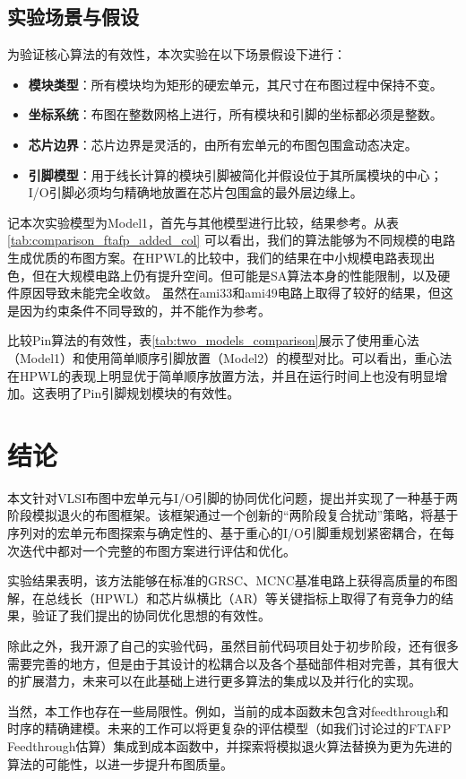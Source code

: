 \documentclass[conference]{IEEEtran}
\begin{document}
\subsection{实验场景与假设}
为验证核心算法的有效性，本次实验在以下场景假设下进行：
\begin{itemize}
    \item \textbf{模块类型}：所有模块均为矩形的硬宏单元，其尺寸在布图过程中保持不变。
    \item \textbf{坐标系统}：布图在整数网格上进行，所有模块和引脚的坐标都必须是整数。
    \item \textbf{芯片边界}：芯片边界是灵活的，由所有宏单元的布图包围盒动态决定。
    \item \textbf{引脚模型}：用于线长计算的模块引脚被简化并假设位于其所属模块的中心；I/O引脚必须均匀精确地放置在芯片包围盒的最外层边缘上。
\end{itemize}

记本次实验模型为Model1，首先与其他模型进行比较，结果参考\cite{10.1145/3658617.3697728}。从表 \ref{tab:comparison_ftafp_added_col} 可以看出，我们的算法能够为不同规模的电路生成优质的布图方案。在HPWL的比较中，我们的结果在中小规模电路表现出色，但在大规模电路上仍有提升空间。但可能是SA算法本身的性能限制，以及硬件原因导致未能完全收敛。
虽然在ami33和ami49电路上取得了较好的结果，但这是因为约束条件不同导致的，并不能作为参考。

比较Pin算法的有效性，表\ref{tab:two_models_comparison}展示了使用重心法（Model1）和使用简单顺序引脚放置（Model2）的模型对比。可以看出，重心法在HPWL的表现上明显优于简单顺序放置方法，并且在运行时间上也没有明显增加。这表明了Pin引脚规划模块的有效性。


\section{结论}
本文针对VLSI布图中宏单元与I/O引脚的协同优化问题，提出并实现了一种基于两阶段模拟退火的布图框架。该框架通过一个创新的“两阶段复合扰动”策略，将基于序列对的宏单元布图探索与确定性的、基于重心的I/O引脚重规划紧密耦合，在每次迭代中都对一个完整的布图方案进行评估和优化。

实验结果表明，该方法能够在标准的GRSC、MCNC基准电路上获得高质量的布图解，在总线长（HPWL）和芯片纵横比（AR）等关键指标上取得了有竞争力的结果，验证了我们提出的协同优化思想的有效性。

除此之外，我开源了自己的实验代码，虽然目前代码项目处于初步阶段，还有很多需要完善的地方，但是由于其设计的松耦合以及各个基础部件相对完善，其有很大的扩展潜力，未来可以在此基础上进行更多算法的集成以及并行化的实现。

当然，本工作也存在一些局限性。例如，当前的成本函数未包含对feedthrough和时序的精确建模。未来的工作可以将更复杂的评估模型（如我们讨论过的FTAFP Feedthrough估算）集成到成本函数中，并探索将模拟退火算法替换为更为先进的算法的可能性，以进一步提升布图质量。



\end{document}
